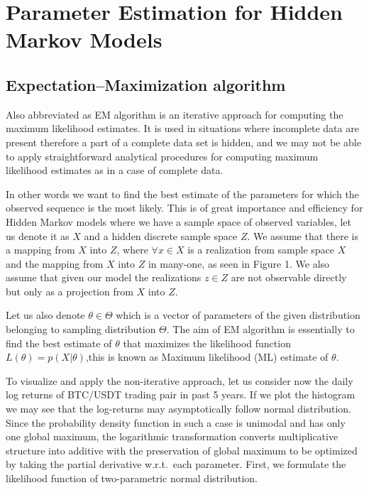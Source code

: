 
\chapter{Parameter Estimation for Hidden Markov Models}

\ifpdf
    \graphicspath{{Chapter2/Figs/Raster/}{Chapter2/Figs/PDF/}{Chapter2/Figs/}}
\else
    \graphicspath{{Chapter2/Figs/Vector/}{Chapter2/Figs/}}
\fi

\section{ Expectation–Maximization algorithm}

Also abbreviated as EM algorithm is an iterative approach for computing the maximum likelihood estimates. It is used in situations where incomplete data are present therefore a part of a complete data set is hidden, and we may not be able to apply straightforward analytical procedures for computing maximum likelihood estimates as in a case of complete data. 

In other words we want to find the best estimate of the parameters for which the observed sequence is the most likely. This is of great importance and efficiency for Hidden Markov models where we have a sample space of observed variables, let us denote it as $X$ and a hidden discrete sample space $Z$. We assume that there is a mapping from $X$ into $Z$, where $\forall x \in X$ is a realization from sample space $X$ and the mapping from $X$ into $Z$ in many-one, as seen in Figure 1. We also assume that given our model the realizations $z \in Z$ are not observable directly but only as a projection from $X$ into $Z$. 

Let us also denote $\theta \in \Theta$ which is a vector of parameters of the given distribution belonging to sampling distribution $\Theta$. The aim of EM algorithm is essentially to find the best estimate of $\theta$ that maximizes the likelihood function $L(\theta) = p(X|\theta)$,this is known as Maximum likelihood (ML) estimate of $\theta$. 

To visualize and apply the non-iterative approach, let us consider now the daily log returns of BTC/USDT trading pair in past 5 years. If we plot the histogram we may see that the log-returns may asymptotically follow normal distribution. Since the probability density function in such a case is unimodal and has only one global maximum, the logarithmic transformation converts multiplicative structure into additive with the preservation of global maximum to be optimized by taking the partial derivative w.r.t.\ each parameter. First, we formulate the likelihood function of two-parametric normal distribution.
 
